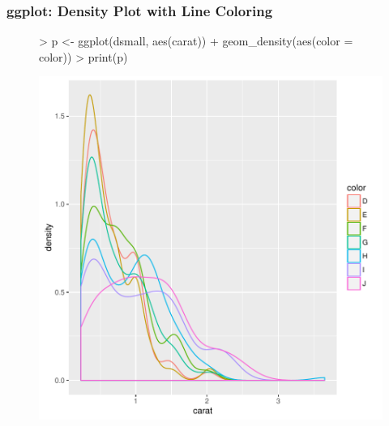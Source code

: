 \documentclass{beamer}
\begin{document}
\begin{frame}[containsverbatim]  
	\frametitle{ggplot: Density Plot with Line Coloring}
\scriptsize 
\begin{figure}
  \centering
\begin{Schunk}
\begin{Sinput}
> p <- ggplot(dsmall, aes(carat)) + geom_density(aes(color = color))
> print(p) 
\end{Sinput}
\end{Schunk}
\includegraphics{fig--069}
\label{fig:qplotscatter}
\end{figure}
\end{frame}
\end{document}

